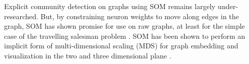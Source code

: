 \documentclass{article}
\begin{document}
Explicit community detection on graphs using SOM remains largely under-researched. 
But, by constraining neuron weights to move along edges in the graph, SOM has shown promise for use on raw graphs, at least for the simple case of the travelling salesman problem \cite{yamakawa2006self}.
SOM has been shown to perform an implicit form of multi-dimensional scaling (MDS) for graph embedding and visualization in the two and three dimensional plane \cite{bonabeau2002graph}.




\end{document}
